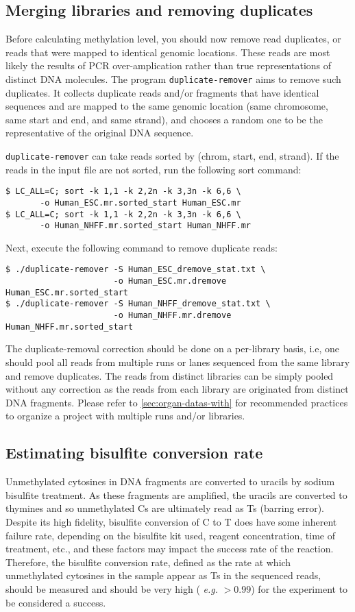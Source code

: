 \documentclass[10pt]{article}
\newcommand{\prog}[1]{\texttt{#1}}
\begin{document}
\subsection{Merging libraries and removing duplicates}

Before calculating methylation level, you should now remove read
duplicates, or reads that were mapped to identical genomic
locations. These reads are most likely the results of PCR
over-amplication rather than true representations of distinct DNA
molecules. The program \prog{duplicate-remover} aims to remove such
duplicates. It collects duplicate reads and/or fragments that have
identical sequences and are mapped to the same genomic location (same
chromosome, same start and end, and same strand), and chooses a random
one to be the representative of the original DNA sequence.

\prog{duplicate-remover} can take reads sorted by (chrom, start, end,
strand). If the reads in the input file are not sorted, run the
following sort command:
\begin{verbatim}
$ LC_ALL=C; sort -k 1,1 -k 2,2n -k 3,3n -k 6,6 \
       -o Human_ESC.mr.sorted_start Human_ESC.mr
$ LC_ALL=C; sort -k 1,1 -k 2,2n -k 3,3n -k 6,6 \
       -o Human_NHFF.mr.sorted_start Human_NHFF.mr
\end{verbatim}
Next, execute the following command to remove duplicate reads:
\begin{verbatim}
$ ./duplicate-remover -S Human_ESC_dremove_stat.txt \
                      -o Human_ESC.mr.dremove Human_ESC.mr.sorted_start
$ ./duplicate-remover -S Human_NHFF_dremove_stat.txt \
                      -o Human_NHFF.mr.dremove Human_NHFF.mr.sorted_start
\end{verbatim}
The duplicate-removal correction should be done on a per-library
basis, i.e, one should pool all reads from multiple runs or lanes
sequenced from the same library and remove duplicates. The reads from
distinct libraries can be simply pooled without any correction as the
reads from each library are originated from distinct DNA
fragments. Please refer to \ref{sec:organ-datas-with} for recommended
practices to organize a project with multiple runs and/or libraries.


\subsection{Estimating bisulfite conversion rate}
\label{sec:estim-busilf-conv}

Unmethylated cytosines in DNA fragments are converted to uracils by
sodium bisulfite treatment. As these fragments are amplified, the
uracils are converted to thymines and so unmethylated Cs are
ultimately read as Ts (barring error). Despite its high fidelity,
bisulfite conversion of C to T does have some inherent failure rate,
depending on the bisulfite kit used, reagent concentration, time of
treatment, etc., and these factors may impact the success rate of the
reaction. Therefore, the bisulfite conversion rate, defined as the
rate at which unmethylated cytosines in the sample appear as Ts in the
sequenced reads, should be measured and should be very high ({\em
  e.g.} $>0.99$) for the experiment to be considered a success.
\end{document}
